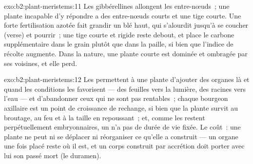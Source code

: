 \begin{solution}{exo:b2:plant-meristems:11}
Les gibbérellines allongent les entre-nœuds~; une plante incapable d'y
répondre a des entre-nœuds courts et une tige courte. Une forte
fertilisation azotée fait grandir un blé haut, qui s'alourdit jusqu'à
se coucher (verse) et pourrir~; une tige courte et rigide reste debout,
et place le carbone supplémentaire dans le grain plutôt que dans la
paille, si bien que l'indice de récolte augmente. Dans la nature, une
plante courte est dominée et ombragée par ses voisines, et elle perd.
\end{solution}

\begin{solution}{exo:b2:plant-meristems:12}
Les  permettent à une plante d'ajouter des organes là et
quand les conditions les favorisent --- des feuilles vers la lumière,
des racines vers l'eau --- et d'abandonner ceux qui ne sont pas
rentables~; chaque bourgeon axillaire est un point de croissance de
rechange, si bien que la plante survit au broutage, au feu et à la
taille en repoussant~; et, comme les  restent perpétuellement
embryonnaires, un  n'a pas de durée de vie fixée. Le coût~: une
plante ne peut ni se déplacer ni réorganiser ce qu'elle a construit ---
un organe une fois placé reste où il est, et un corps construit par
accrétion doit porter avec lui son passé mort (le duramen).
\end{solution}

